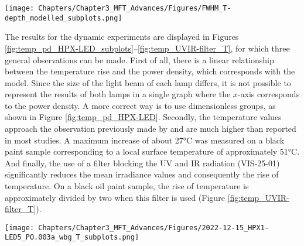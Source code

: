 \vspace{1cm}

\begin{figure*}
\centering
\texttt{[image: Chapters/Chapter3\_MFT\_Advances/Figures/FWHM\_T-depth\_modelled\_subplots.png]}
\caption[\hspace{0.3cm}Variations of the penetration depth of heat according to the size of the fading beam]{Modelled variations of the penetration depth of heat according to the size of the fading beam: (a) when the power is fixed and (b) when the power density is fixed.}
\label{fig:temp-model_results_2}
\end{figure*}

\newpage

The results for the dynamic experiments are displayed in Figures \ref{fig:temp_pd_HPX-LED_subplots}–\ref{fig:temp_UVIR-filter_T}, for which three general observations can be made. First of all, there is a linear relationship between the temperature rise and the power density, which corresponds with the model. Since the size of the light beam of each lamp differs, it is not possible to represent the results of both lamps in a single graph where the $x$-axis corresponds to the power density. A more correct way is to use dimensionless groups, as shown in Figure \ref{fig:temp_pd_HPX-LED}. Secondly, the temperature values approach the observation previously made by \citep[405]{whitmore_predicting_1999} and are much higher than reported in most studies. A maximum increase of about 27\unit{\degreeCelsius} was measured on a black paint sample corresponding to a local surface temperature of approximately 51\unit{\degreeCelsius}. And finally, the use of a filter blocking the \gls{UV} and \gls{IR} radiation (VIS-25-01) significantly reduces the mean irradiance values and consequently the rise of temperature. On a black oil paint sample, the rise of temperature is approximately divided by two when this filter is used (Figure \ref{fig:temp_UVIR-filter_T}).\\

\vspace{1cm}

\begin{figure*}[!h]
\centering
\texttt{[image: Chapters/Chapter3\_MFT\_Advances/Figures/2022-12-15\_HPX1-LED5\_PO.003a\_wbg\_T\_subplots.png]}
\caption[\hspace{0.3cm}Increase of temperature a function of power density]{Increase of temperature as a function of power density, obtained on ivory black oil paint sample (PO.003a): (a) \acrshort{HPX} lamp and (b) \gls{LED} lamp.}
\label{fig:temp_pd_HPX-LED_subplots}
\end{figure*}


